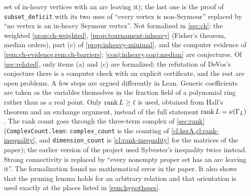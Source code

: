 set of in-heavy vertices with an arc leaving it); the last one is the
proof of \texttt{subset\_deficit} with its two uses of ``every vertex is
non-Seymour'' replaced by ``no vertex is an in-heavy Seymour vertex''.
Not formalized in \cref{sec:ch}: the weighted \cref{prop:ch-weighted},
\cref{prop:tournament-inheavy} (Fisher's theorem, median orders), part (c) of
\cref{prop:inheavy-minimal}, and the computer evidence of
\cref{rem:ch-evidence,rem:ch-barriers}; \cref{conj:inheavy,conj:median}
are conjectures. Of \cref{sec:related}, only items (a) and (c) are formalized;
the refutation of DeVos's conjecture there is a computer check with an explicit
certificate, and the rest are open problems.
A few steps are argued differently in Lean. Generic coefficients are taken
as the variables themselves in the fraction field of a polynomial ring
rather than as a real point. Only $\operatorname{rank} L\ge\ell$ is used, obtained from
Hall's theorem and an exchange argument, instead of the full statement
$\operatorname{rank} L=\nu(\Gamma_L)$. The rank count goes through the three-term complex of \cref{sec:rank}
(\texttt{ComplexCount.lean}: \texttt{complex\_count} is the counting of
\cref{cl:kerA,cl:rank-inequality}, and \texttt{dimension\_count} is
\cref{cl:rank-inequality} for the matrices of the paper); the earlier
version of the project used Sylvester's inequality twice instead. Strong connectivity is replaced by ``every nonempty
proper set has an arc leaving it''. The formalization found no mathematical
error in the paper. It also shows that the pruning lemma holds for an
arbitrary relation and that orientation is used exactly at the places listed
in \cref{rem:hypotheses}.
